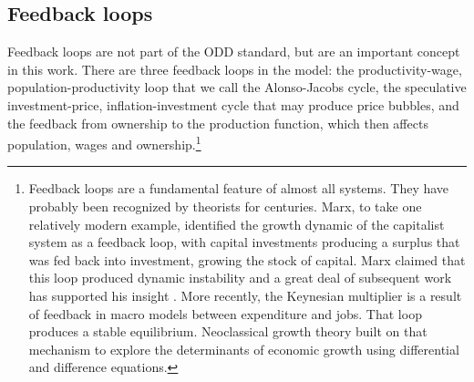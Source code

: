 
\subsection{Feedback loops}
Feedback loops are not part of the ODD standard, but are an important concept in this work. 
There are three \glspl{feedback loop} in the model: the productivity-wage, population-productivity loop that we call the Alonso-Jacobs cycle,  the speculative investment-price, inflation-investment cycle that may produce price bubbles, and the feedback from ownership to the production function, which then affects population, wages and ownership.\footnote{Feedback loops are a fundamental feature of almost all systems. They have probably been recognized by theorists for centuries. Marx, to take one relatively modern example, identified the growth dynamic of the capitalist system  as a feedback loop, with capital investments producing a surplus that was fed back into investment, growing the stock of capital. Marx claimed that this loop produced dynamic instability and a great deal of subsequent work has supported his insight \cite{dumenilStabilityInstabilityDynamic1986} \cite{schumpeterInstabilityCapitalism1928}. More recently, the Keynesian multiplier is a result of feedback in macro models between expenditure and jobs. That loop produces a stable equilibrium. Neoclassical growth theory built on that mechanism to explore the determinants of economic growth using differential and difference equations. %
}
 
